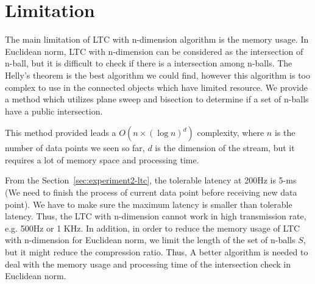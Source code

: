 





\section{Limitation}


The main limitation of LTC with n-dimension algorithm is the memory usage. In
Euclidean norm, LTC with n-dimension can be considered as the intersection of
n-ball, but it is difficult to check if there is a intersection among n-balls.
The Helly's theorem is the best algorithm we could find, however this algorithm
is too complex to use in the connected objects which have limited resource.  We
provide a method which utilizes plane sweep and bisection to determine if a set
of n-balls have a public intersection.

This method provided leads a $O(n\times (\log{n})^d)$ complexity, where $n$ is
the number of data points we seen so far, $d$ is the dimension of the stream,
but it requires a lot of memory space and processing time. 

From the Section~\ref{sec:experiment2-ltc}, the tolerable latency at 200Hz is
5-ms (We need to finish the process of current data point before receiving new
data point). We have to make sure the maximum latency is smaller than tolerable
latency. Thus, the LTC with n-dimension cannot work in high transmission rate,
e.g. 500Hz or 1 KHz.  In addition, in order to reduce the memory usage of LTC
with n-dimension for Euclidean norm, we limit the length of the set of n-balls
$S$, but it might reduce the compression ratio. Thus, A better algorithm is
needed to deal with the memory usage and processing time of the intersection
check in Euclidean norm.

% 

